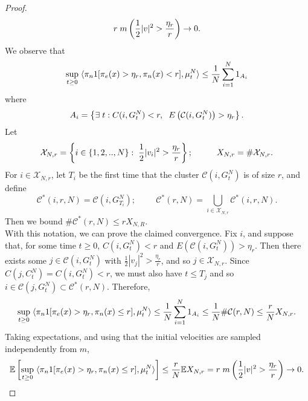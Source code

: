 \documentclass[11pt, notitlepage]{article}
\begin{document}
\begin{proof}
\begin{equation}
    r\hspace{0.1cm}m\left(\frac{1}{2}|v|^2>\frac{\eta_r}{r}\right)\rightarrow 0.
\end{equation}We observe that \begin{equation}
    \sup_{t\geq 0} \hspace{0.1cm} \langle \pi_n 1[\pi_e(x)>\eta_r, \pi_n(x)< r], \mu^N_t\rangle \leq \frac{1}{N}\sum_{i=1}^N 1_{A_i}  
\end{equation} where \begin{equation}
    A_i=\left\{\exists \hspace{0.1cm} t: C(i, G^N_t)< r, \hspace{0.2cm} E\left(\mathcal{C}(i, G^N_t)\right)> \eta_r \right\}.
\end{equation}
Let
\begin{equation}
    \mathcal{X}_{N,r}=\left\{i \in \{1,2,..,N\}: \hspace{0.1cm} \frac{1}{2}|v_i|^2>\frac{\eta_r}{r}\right\}; \hspace{1cm}X_{N,r}=\#\mathcal{X}_{N,r}.
\end{equation} For $i\in \mathcal{X}_{N,r}$, let $T_{i}$ be the first time that the cluster $\mathcal{C}(i, G^N_t)$ is of size $r$, and define \begin{equation}
    \mathcal{C}^*(i,r,N)=\mathcal{C}(i, G^N_{T_i});\hspace{1cm} \mathcal{C}^*(r,N)=\bigcup_{i\in \mathcal{X}_{N,r}} \mathcal{C}^*(i,r,N).
\end{equation} Then we bound $\#\mathcal{C}^*(r,N)\le r X_{N,R}$.  \medskip \\ With this notation, we can prove the claimed convergence. Fix $i$, and suppose that, for some time $t\geq 0$, $C(i, G^N_t)< r$ and $E(\mathcal{C}(i, G^N_t))> \eta_r.$ Then there exists some $j \in \mathcal{C}(i, G^N_t)$ with $\frac{1}{2}|v_j|^2 >\frac{\eta_r}{r}$, and so $j\in \mathcal{X}_{N,r}$. Since $C(j, C^N_t)=C(i, G^N_t)< r$, we must also have $t\le T_j$ and so $i\in\mathcal{C}(j,G^N_t) \subset \mathcal{C}^*(r,N).$ Therefore, \begin{equation}
    \sup_{t\geq 0} \hspace{0.1cm} \langle \pi_n 1[\pi_e(x)>\eta_r, \pi_n(x)\le r], \mu^N_t\rangle \le \frac{1}{N}\sum_{i=1}^N 1_{A_i} \le \frac{1}{N}\#\mathcal{C}(r,N) \le \frac{r}{N}X_{N,r}.
\end{equation}
Taking expectations, and using that the initial velocities are sampled independently from $m$,
\begin{equation} \begin{split}
    \mathbb{E}\left[\sup_{t\geq 0} \hspace{0.1cm} \langle \pi_n 1[\pi_e(x)>\eta_r, \pi_n(x)\le r], \mu^N_t\rangle\right] \le \frac{r}{N} \mathbb{E} X_{N,r}  = r\hspace{0.1cm}m\left(\frac{1}{2}|v|^2>\frac{\eta_r}{r}\right) \rightarrow 0. 
\end{split} \end{equation}
\end{proof}
\end{document}
